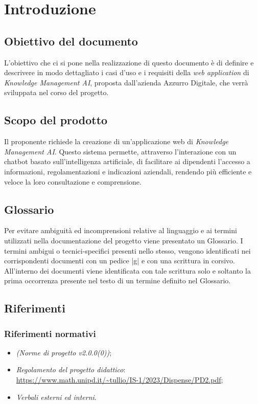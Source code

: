 \documentclass[10pt, a4paper]{article}
\title{\titolo}
\author{SWEetCode}
\begin{document}



\newpage

\tableofcontents
\newpage

\listoffigures
\newpage

\listoftables
\newpage

\section{Introduzione}
\subsection{Obiettivo del documento}
L'obiettivo che ci si pone nella realizzazione di questo documento è di definire e descrivere in modo dettagliato i casi d'uso e i requisiti della \textit{web application} di \textit{Knowledge Management AI}, proposta dall'azienda Azzurro Digitale, che verrà sviluppata nel corso del progetto.
\subsection{Scopo del prodotto}
Il proponente richiede la creazione di un'applicazione web di \textit{Knowledge Management AI}. Questo sistema permette, attraverso l'interazione con un chatbot basato sull'intelligenza artificiale, di facilitare ai dipendenti l'accesso a informazioni, regolamentazioni e indicazioni aziendali, rendendo più efficiente e veloce la loro consultazione e comprensione.

\subsection{Glossario}
Per evitare ambiguità ed incomprensioni relative al linguaggio e ai termini utilizzati nella documentazione del progetto viene presentato un Glossario.
I termini ambigui o tecnici-specifici presenti nello stesso, vengono identificati nei corrispondenti documenti con un pedice |g| e con una scrittura in corsivo.
All'interno dei documenti viene identificata con tale scrittura solo e soltanto la prima occorrenza presente nel testo di un termine definito nel Glossario.

\subsection{Riferimenti}
\subsubsection{Riferimenti normativi}
\begin{itemize}
    \item \textit{(Norme di progetto v2.0.0(0))};
    \item \textit{Regolamento del progetto didattico}: \\
    \href{https://www.math.unipd.it/~tullio/IS-1/2023/Dispense/PD2.pdf}{https://www.math.unipd.it/\textasciitilde tullio/IS-1/2023/Dispense/PD2.pdf};
    \item \textit{Verbali esterni ed interni}.
\end{itemize}
\end{document}
